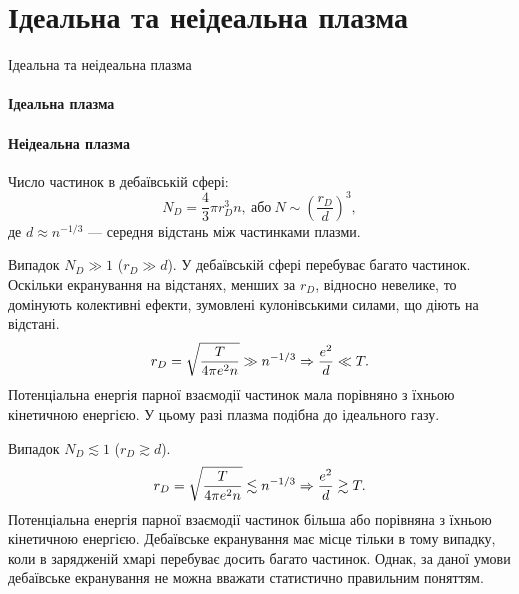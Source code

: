 \documentclass[]{beamer}
\begin{document}
\section{Ідеальна та неідеальна плазма}

\begin{frame}{Ідеальна та неідеальна плазма}{}
	\framesubtitle<1>{Ідеальна плазма}
	\framesubtitle<2>{Неідеальна плазма}
	\begin{block}{}
		Число частинок в дебаївській сфері:
		\begin{equation*}
			N_D = \frac43\pi r_D^3 n,\ \text{або}\ N \sim \left( \frac{r_D}{d}\right)^3,
		\end{equation*}
		де $d \approx n^{-1/3}$ --- середня відстань між частинками плазми.
	\end{block}
	\begin{overprint}
		\begin{block}{Випадок $N_D \gg 1$ ($r_D \gg d$).}\justifying\scriptsize
			У дебаївській сфері перебуває багато частинок. Оскільки екранування на відстанях, менших за $r_D$, відносно невелике, то домінують колективні ефекти, зумовлені кулонівськими силами, що діють на відстані.
			\begin{equation*}
				r_D = \sqrt{\frac{T}{4\pi e^2n}} \gg n^{-1/3} \Rightarrow \frac{e^2}{d} \ll T.
			\end{equation*}
			Потенціальна енергія \alert{парної} взаємодії частинок мала порівняно з їхньою кінетичною енергією. У цьому разі плазма подібна до \alert{ідеального} газу.
		\end{block}
		\begin{block}{Випадок $N_D \lesssim 1$ ($r_D \gtrsim d$).}\justifying\scriptsize
			\begin{equation*}
				r_D = \sqrt{\frac{T}{4\pi e^2n}} \lesssim n^{-1/3} \Rightarrow \frac{e^2}{d} \gtrsim T.
			\end{equation*}
			Потенціальна енергія \alert{парної} взаємодії частинок більша або порівняна з їхньою кінетичною енергією. Дебаївське екранування має місце
			тільки в тому випадку, коли в зарядженій хмарі перебуває  досить багато частинок. Однак, за даної умови дебаївське екранування не можна
			вважати статистично правильним поняттям.


\end{block}
\end{overprint}
\end{frame}
\end{document}
